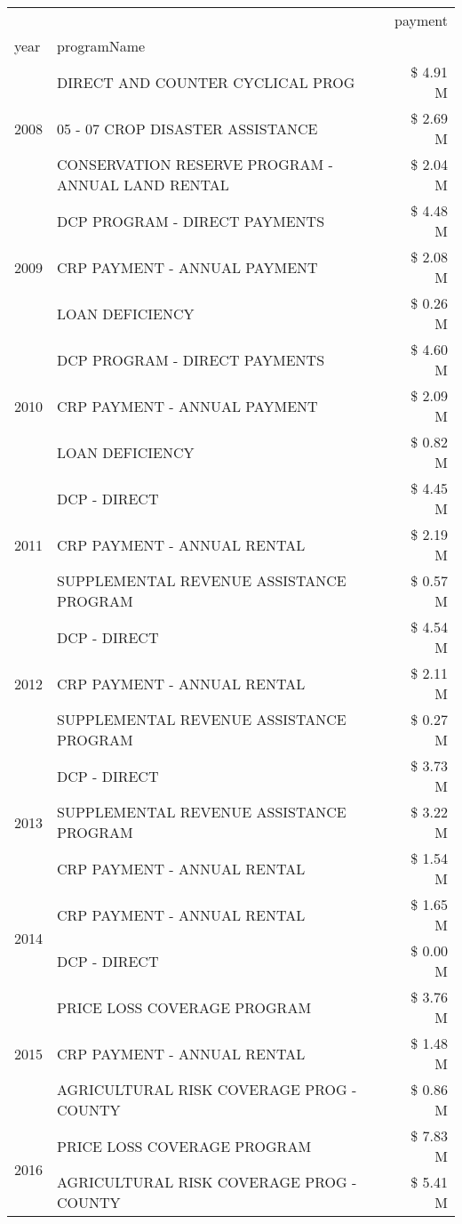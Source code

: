 \begin{tabular}{llr}
\toprule
 &  & payment \\
year & programName &  \\
\midrule
\multirow[t]{3}{*}{2008} & DIRECT AND COUNTER CYCLICAL PROG & \$ 4.91 M \\
 & 05 - 07 CROP DISASTER ASSISTANCE & \$ 2.69 M \\
 & CONSERVATION RESERVE PROGRAM - ANNUAL LAND RENTAL & \$ 2.04 M \\
\cline{1-3}
\multirow[t]{3}{*}{2009} & DCP PROGRAM - DIRECT PAYMENTS & \$ 4.48 M \\
 & CRP PAYMENT - ANNUAL PAYMENT & \$ 2.08 M \\
 & LOAN DEFICIENCY & \$ 0.26 M \\
\cline{1-3}
\multirow[t]{3}{*}{2010} & DCP PROGRAM - DIRECT PAYMENTS & \$ 4.60 M \\
 & CRP PAYMENT - ANNUAL PAYMENT & \$ 2.09 M \\
 & LOAN DEFICIENCY & \$ 0.82 M \\
\cline{1-3}
\multirow[t]{3}{*}{2011} & DCP - DIRECT & \$ 4.45 M \\
 & CRP PAYMENT - ANNUAL RENTAL & \$ 2.19 M \\
 & SUPPLEMENTAL REVENUE ASSISTANCE PROGRAM & \$ 0.57 M \\
\cline{1-3}
\multirow[t]{3}{*}{2012} & DCP - DIRECT & \$ 4.54 M \\
 & CRP PAYMENT - ANNUAL RENTAL & \$ 2.11 M \\
 & SUPPLEMENTAL REVENUE ASSISTANCE PROGRAM & \$ 0.27 M \\
\cline{1-3}
\multirow[t]{3}{*}{2013} & DCP - DIRECT & \$ 3.73 M \\
 & SUPPLEMENTAL REVENUE ASSISTANCE PROGRAM & \$ 3.22 M \\
 & CRP PAYMENT - ANNUAL RENTAL & \$ 1.54 M \\
\cline{1-3}
\multirow[t]{2}{*}{2014} & CRP PAYMENT - ANNUAL RENTAL & \$ 1.65 M \\
 & DCP - DIRECT & \$ 0.00 M \\
\cline{1-3}
\multirow[t]{3}{*}{2015} & PRICE LOSS COVERAGE PROGRAM & \$ 3.76 M \\
 & CRP PAYMENT - ANNUAL RENTAL & \$ 1.48 M \\
 & AGRICULTURAL RISK COVERAGE PROG - COUNTY & \$ 0.86 M \\
\cline{1-3}
\multirow[t]{3}{*}{2016} & PRICE LOSS COVERAGE PROGRAM & \$ 7.83 M \\
 & AGRICULTURAL RISK COVERAGE PROG - COUNTY & \$ 5.41 M \\

\end{tabular}
